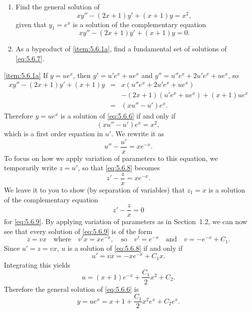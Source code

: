 \documentclass{ximera}
\begin{document}
\begin{example}\label{example:5.6.1} 
\begin{enumerate}
\item \label{item:5.6.1a} %
 Find the general solution of
\begin{equation} \label{eq:5.6.6}
xy''-(2x+1)y'+(x+1)y=x^2,
\end{equation}
given that $y_1=e^x$ is a solution of the complementary equation
\begin{equation} \label{eq:5.6.7}
xy''-(2x+1)y'+(x+1)y=0.
\end{equation}
\item \label{item:5.6.1b}%
As a byproduct of \ref{item:5.6.1a}, find a fundamental set of solutions of
\eqref{eq:5.6.7}.
\end{enumerate}

\begin{explanation} \ref{item:5.6.1a}
If
$y=ue^x$, then $y'=u'e^x+ue^x$ and
$y''=u''e^x+2u'e^x+ue^x$, so
\begin{eqnarray*}
xy''-(2x+1)y'+(x+1)y&=&x(u''e^x+2u'e^x+ue^x)\\
&&-(2x+1)(u'e^x+ue^x)+(x+1)ue^x\\
&=&(xu''-u')e^x.
\end{eqnarray*}
Therefore $y=ue^x$ is a solution of \eqref{eq:5.6.6} if and only if
$$
(xu''-u')e^x=x^2,
$$
which is a first order equation in $u'$. We rewrite it as
\begin{equation} \label{eq:5.6.8}
u''-\frac{u'}{x}=xe^{-x}.
\end{equation}
To focus on how we apply variation of parameters to this equation, we
temporarily write $z=u'$, so that \eqref{eq:5.6.8} becomes
\begin{equation} \label{eq:5.6.9}
z'-\frac{z}{x}=xe^{-x}.
\end{equation}
We leave it to you to show (by separation of variables) that $z_1=x$
is a solution of the complementary equation
$$
z'-\frac{z}{x}=0
$$
for \eqref{eq:5.6.9}. By applying variation of parameters as in
Section~1.2, we can now see that every solution of
\eqref{eq:5.6.9} is of the form
$$
z=vx\quad\mbox{where}\quad
v'x=xe^{-x}, \quad\mbox{so}\quad v'=e^{-x} \quad\mbox{and}\quad
v=-e^{-x}+C_1.
$$
Since $u'=z=vx$,   $u$ is a solution of \eqref{eq:5.6.8} if and only if
$$
u'=vx=-xe^{-x}+C_1x.
$$
Integrating this yields
$$
u=(x+1)e^{-x}+\frac{C_1}{2}x^2+C_2.
$$
Therefore the general solution of  \eqref{eq:5.6.6} is
\begin{equation} \label{eq:5.6.10}
y=ue^x=x+1+\frac{C_1}{2}x^2e^x+C_2e^x.
\end{equation}


\end{explanation}
\end{example}
\end{document}
